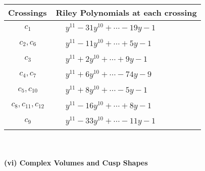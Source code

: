 \documentclass[1p]{elsarticle_modified}
\theoremstyle{definition}
\begin{document}
\begin{tabular}{m{50pt}|m{274pt}}
Crossings & \hspace{64pt}Riley Polynomials at each crossing \\
\hline $$\begin{aligned}c_{1}\end{aligned}$$&$\begin{aligned}
&y^{11}-31 y^{10}+\cdots-19 y-1
\end{aligned}$\\
\hline $$\begin{aligned}c_{2},c_{6}\end{aligned}$$&$\begin{aligned}
&y^{11}-11 y^{10}+\cdots+5 y-1
\end{aligned}$\\
\hline $$\begin{aligned}c_{3}\end{aligned}$$&$\begin{aligned}
&y^{11}+2 y^{10}+\cdots+9 y-1
\end{aligned}$\\
\hline $$\begin{aligned}c_{4},c_{7}\end{aligned}$$&$\begin{aligned}
&y^{11}+6 y^{10}+\cdots-74 y-9
\end{aligned}$\\
\hline $$\begin{aligned}c_{5},c_{10}\end{aligned}$$&$\begin{aligned}
&y^{11}+8 y^{10}+\cdots-5 y-1
\end{aligned}$\\
\hline $$\begin{aligned}c_{8},c_{11},c_{12}\end{aligned}$$&$\begin{aligned}
&y^{11}-16 y^{10}+\cdots+8 y-1
\end{aligned}$\\
\hline $$\begin{aligned}c_{9}\end{aligned}$$&$\begin{aligned}
&y^{11}-33 y^{10}+\cdots-11 y-1
\end{aligned}$\\
\hline
\end{tabular}\\~\\
\newpage\flushleft \textbf{(vi) Complex Volumes and Cusp Shapes}
\end{document}
